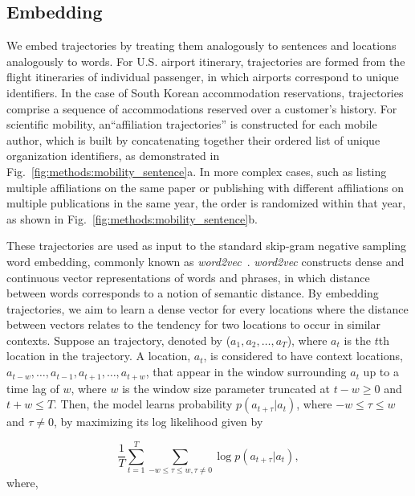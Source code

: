 \documentclass[12pt]{article} %
\begin{document}
\subsection*{Embedding}
We embed trajectories by treating them analogously to sentences and locations analogously to words. 
For U.S. airport itinerary, trajectories are formed from the flight itineraries of individual passenger, in which airports correspond to unique identifiers. 
In the case of South Korean accommodation reservations, trajectories comprise a sequence of accommodations reserved over a customer's history.
For scientific mobility, an``affiliation trajectories'' is constructed for each mobile author, which is built by concatenating together their ordered list of unique organization identifiers, as demonstrated in Fig.~\ref{fig:methods:mobility_sentence}a.
In more complex cases, such as listing multiple affiliations on the same paper or publishing with different affiliations on multiple publications in the same year, the order is randomized within that year, as shown in Fig.~\ref{fig:methods:mobility_sentence}b.

These trajectories are used as input to the standard skip-gram negative sampling word embedding, commonly known as \textit{word2vec}~\autocite{mikolov2013word2vec}.
\textit{word2vec} constructs dense and continuous vector representations of words and phrases, in which distance between words corresponds to a notion of semantic distance. By embedding trajectories, we aim to learn a dense vector for every locations where the distance between vectors relates to the tendency for two locations to occur in similar contexts.
Suppose an trajectory, denoted by ($a_{1}, a_{2}, \ldots, a_{T}$), where $a_{t}$ is the $t$th location in the trajectory. A location, $a_{t}$, is considered to have context locations, $a_{t-w}, \ldots, a_{t-1}, a_{t+1},\ldots, a_{t+w}$, that appear in the window surrounding $a_t$ up to a time lag of $w$, where $w$ is the window size parameter truncated at $t - w \geq 0$ and $t + w \leq T$. Then, the model learns probability $p(a_{t + \tau} \vert a_{t})$, where $-w\leq \tau\leq w$ and $\tau \neq 0$,  by maximizing its log likelihood given by

%
%
\begin{equation}
\frac{1}{T}\sum_{t = 1}^{T} \sum_{-w \leq \tau \leq w, \tau \neq 0} \log p(a_{t + \tau} \vert a_{t}),
\end{equation}
where,
\end{document}
